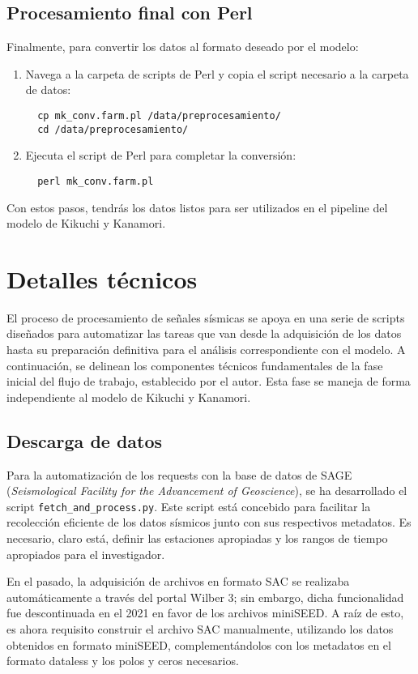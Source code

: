 \documentclass[a4paper,11pt]{refart}
\begin{document}
\subsection{Procesamiento final con Perl}

Finalmente, para convertir los datos al formato deseado por el modelo:
  \begin{enumerate}
  \item Navega a la carpeta de scripts de Perl y copia el script necesario a la carpeta de datos:
  \begin{verbatim}
  cp mk_conv.farm.pl /data/preprocesamiento/
  cd /data/preprocesamiento/
  \end{verbatim}
  \item Ejecuta el script de Perl para completar la conversión:
  \begin{verbatim}
  perl mk_conv.farm.pl
  \end{verbatim}
\end{enumerate}
Con estos pasos, tendrás los datos listos para ser utilizados en el pipeline del modelo de Kikuchi y Kanamori.

\section{Detalles técnicos}

El proceso de procesamiento de señales sísmicas se apoya en una serie de scripts diseñados para automatizar las tareas que van desde la adquisición de los datos hasta su preparación definitiva para el análisis correspondiente con el modelo. A continuación, se delinean los componentes técnicos fundamentales de la fase inicial del flujo de trabajo, establecido por el autor. Esta fase se maneja de forma independiente al modelo de Kikuchi y Kanamori.

\subsection{Descarga de datos}

Para la automatización de los requests con la base de datos de SAGE (\textit{Seismological Facility for the Advancement of Geoscience}), se ha desarrollado el script \texttt{fetch\_and\_process.py}. Este script está concebido para facilitar la recolección eficiente de los datos sísmicos junto con sus respectivos metadatos. Es necesario, claro está, definir las estaciones apropiadas y los rangos de tiempo apropiados para el investigador.

En el pasado, la adquisición de archivos en formato SAC se realizaba automáticamente a través del portal Wilber 3; sin embargo, dicha funcionalidad fue descontinuada en el 2021 en favor de los archivos miniSEED. A raíz de esto, es ahora requisito construir el archivo SAC manualmente, utilizando los datos obtenidos en formato miniSEED, complementándolos con los metadatos en el formato dataless y los polos y ceros necesarios.
\end{document}
